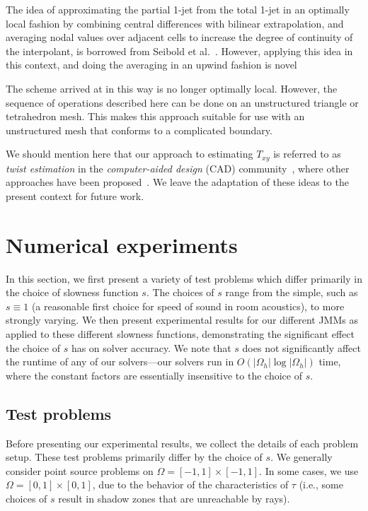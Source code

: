 \documentclass{siamart190516}
\begin{document}
The idea of approximating the partial 1-jet from the total 1-jet in an
optimally local fashion by combining central differences with bilinear
extrapolation, and averaging nodal values over adjacent cells to
increase the degree of continuity of the interpolant, is borrowed from
Seibold et al.~\cite{Seibold:2011aa}. However, applying this idea in
this context, and doing the averaging in an upwind fashion is novel

The scheme arrived at in this way is no longer optimally
local. However, the sequence of operations described here can be done
on an unstructured triangle or tetrahedron mesh. This makes this
approach suitable for use with an unstructured mesh that conforms to a
complicated boundary.

We should mention here that our approach to estimating $T_{xy}$ is
referred to as \emph{twist estimation} in the \emph{computer-aided
  design} (CAD) community~\cite{Farin:2014aa}, where other approaches
have been proposed~\cite{Brunet:1985aa,Hagen:1987aa}. We leave the
adaptation of these ideas to the present context for future work.

\section{Numerical experiments} In this section, we first present a
variety of test problems which differ primarily in the choice of
slowness function $s$. The choices of $s$ range from the simple, such
as $s \equiv 1$ (a reasonable first choice for speed of sound in room
acoustics), to more strongly varying. We then present experimental
results for our different JMMs as applied to these different slowness
functions, demonstrating the significant effect the choice of $s$ has
on solver accuracy. We note that $s$ does not significantly affect the
runtime of any of our solvers---our solvers run in
$O(|\Omega_h| \log |\Omega_h|)$ time, where the constant factors are
essentially insensitive to the choice of $s$.

\subsection{Test problems} Before presenting our experimental results,
we collect the details of each problem setup. These test problems
primarily differ by the choice of $s$. We generally consider point
source problems on $\Omega = [-1, 1] \times [-1, 1]$. In some cases,
we use $\Omega = [0, 1] \times [0, 1]$, due to the behavior of the
characteristics of $\tau$ (i.e., some choices of $s$ result in shadow
zones that are unreachable by rays).
\end{document}
